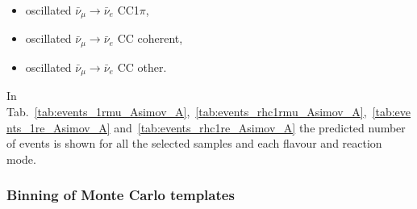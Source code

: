 \begin{itemize}
\item  oscillated $\bar{\nu}_{\mu} \rightarrow \bar{\nu}_{e}$ CC1$\pi$,
\item  oscillated $\bar{\nu}_{\mu} \rightarrow \bar{\nu}_{e}$ CC coherent,
\item  oscillated $\bar{\nu}_{\mu} \rightarrow \bar{\nu}_{e}$ CC other.
\end{itemize}

In Tab.~\ref{tab:events_1rmu_Asimov_A},~\ref{tab:events_rhc1rmu_Asimov_A},~\ref{tab:events_1re_Asimov_A} 
and~\ref{tab:events_rhc1re_Asimov_A}
the predicted number of events is shown for all the selected samples 
and each flavour and reaction mode.









\subsubsection {Binning of Monte Carlo templates}
\label{sec:mc_templates:template_binning}

